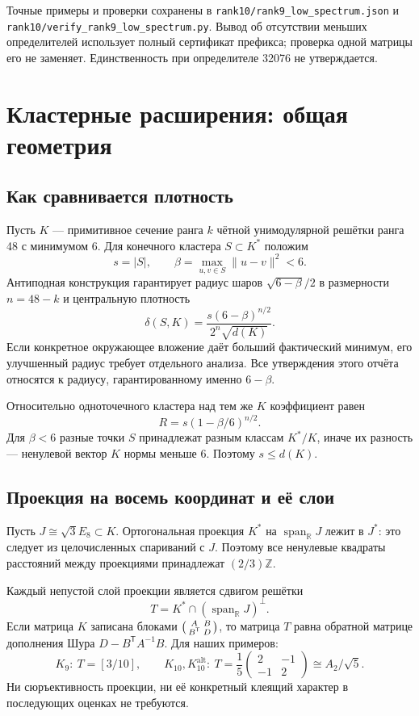 \documentclass[11pt,a4paper]{article}
\theoremstyle{remark}\newtheorem{remark}[theorem]{Замечание}
\newcommand{\Z}{\mathbb Z}\newcommand{\R}{\mathbb R}\newcommand{\F}{\mathbb F}
\newcommand{\spanR}{\operatorname{span}_{\R}}\newcommand{\diag}{\operatorname{diag}}
\newcommand{\Kalt}{K_{10}^{\mathrm{alt}}}
\newcommand{\file}[1]{{\small\nolinkurl{#1}}}
\begin{document}
Точные примеры и проверки сохранены в \file{rank10/rank9_low_spectrum.json} и \file{rank10/verify_rank9_low_spectrum.py}. Вывод об отсутствии меньших определителей использует полный сертификат префикса; проверка одной матрицы его не заменяет. Единственность при определителе 32076 не утверждается.


\section{Кластерные расширения: общая геометрия}

\subsection{Как сравнивается плотность}

Пусть $K$ --- примитивное сечение ранга $k$ чётной унимодулярной решётки ранга 48 с минимумом 6. Для конечного кластера $S\subset K^*$ положим
\[
s=|S|,\qquad\beta=\max_{u,v\in S}\|u-v\|^2<6.
\]
Антиподная конструкция гарантирует радиус шаров $\sqrt{6-\beta}/2$ в размерности $n=48-k$ и центральную плотность
\begin{equation}\label{eq:density}
\delta(S,K)=\frac{s(6-\beta)^{n/2}}{2^n\sqrt{d(K)}}.
\end{equation}
Если конкретное окружающее вложение даёт больший фактический минимум, его улучшенный радиус требует отдельного анализа. Все утверждения этого отчёта относятся к радиусу, гарантированному именно $6-\beta$.

Относительно одноточечного кластера над тем же $K$ коэффициент равен
\begin{equation}\label{eq:ratio}
R=s(1-\beta/6)^{n/2}.
\end{equation}
Для $\beta<6$ разные точки $S$ принадлежат разным классам $K^*/K$, иначе их разность --- ненулевой вектор $K$ нормы меньше 6. Поэтому $s\le d(K)$.

\subsection{Проекция на восемь координат и её слои}

Пусть $J\cong\sqrt3E_8\subset K$. Ортогональная проекция $K^*$ на $\spanR J$ лежит в $J^*$: это следует из целочисленных спариваний с $J$. Поэтому все ненулевые квадраты расстояний между проекциями принадлежат $(2/3)\Z$.

Каждый непустой слой проекции является сдвигом решётки
\[
T=K^*\cap(\spanR J)^\perp.
\]
Если матрица $K$ записана блоками $\begin{psmallmatrix}A&B\\B^{\mathsf T}&D\end{psmallmatrix}$, то матрица $T$ равна обратной матрице дополнения Шура $D-B^{\mathsf T}A^{-1}B$. Для наших примеров:
\begin{equation}\label{eq:fibers}
K_9:\ T=[3/10],\qquad
K_{10},\Kalt:\ T=\frac15\begin{pmatrix}2&-1\\-1&2\end{pmatrix}\cong A_2/\sqrt5.
\end{equation}
Ни сюръективность проекции, ни её конкретный клеящий характер в последующих оценках не требуются.
\end{document}
